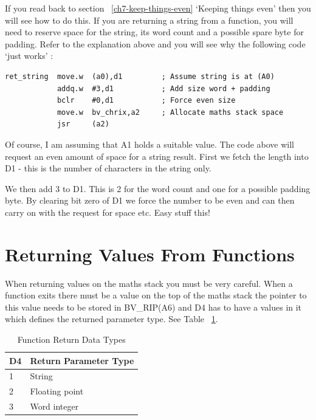 If you read back to section ~\ref{ch7-keep-things-even} `Keeping things
      even' then you will see how to do this. If you are returning a string
      from a function, you will need to reserve space for the string, its
      word count and a possible spare byte for padding. Refer to the
      explanation above and you will see why the following code `just works'
     :

\begin{lstlisting}[firstnumber=1,]
ret_string  move.w  (a0),d1         ; Assume string is at (A0)
            addq.w  #3,d1           ; Add size word + padding
            bclr    #0,d1           ; Force even size
            move.w  bv_chrix,a2     ; Allocate maths stack space
            jsr     (a2)
\end{lstlisting}

Of course, I am assuming that A1 holds a suitable value. The code
      above will request an even amount of space for a string result. First we
      fetch the length into D1 -{} this is the number of characters in the
      string only.

We then add 3 to D1. This is 2 for the word count and one for a
      possible padding byte. By clearing bit zero of D1 we force the number to
      be even and can then carry on with the request for space etc. Easy stuff
      this!

\section{Returning Values From Functions}
\label{ch7-returning-values}%

When returning values on the maths stack you must be very careful.
    When a function exits there must be a value on the top of the maths stack
    the pointer to this value needs to be stored in BV\_RIP(A6) and D4 has to
    have a values in it which defines the returned parameter type. See Table ~\ref{tab:FunctionReturnDataTypes}.

\begin{table}[htbp]
\centering
\begin{tabular}{l l}  %
\toprule
\textbf{D4} & \textbf{Return Parameter Type} \\
\midrule
%
1 & String\\
2 & Floating point\\
3 & Word integer\\%
\bottomrule
\end{tabular}
\caption{Function Return Data Types}
\label{tab:FunctionReturnDataTypes}
\end{table}

